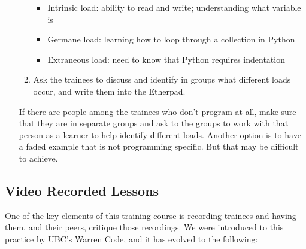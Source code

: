 \begin{itemize}
\begin{enumerate}
    \begin{itemize}
    \itemsep1pt\parskip0pt
    \item
      Intrinsic load: ability to read and write; understanding what
      variable is
    \item
      Germane load: learning how to loop through a collection in Python
    \item
      Extraneous load: need to know that Python requires indentation
    \end{itemize}
  \item
    Ask the trainees to discuss and identify in groups what different
    loads occur, and write them into the Etherpad.
  \end{enumerate}

  If there are people among the trainees who don't program at all, make
  sure that they are in separate groups and ask to the groups to work
  with that person as a learner to help identify different loads.
  Another option is to have a faded example that is not programming
  specific. But that may be difficult to achieve.
\end{itemize}

\subsection{Video Recorded Lessons}\label{video-recorded-lessons}

One of the key elements of this training course is recording trainees
and having them, and their peers, critique those recordings. We were
introduced to this practice by UBC's Warren Code, and it has evolved to
the following:

